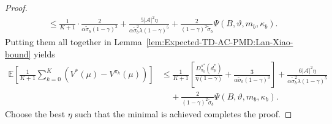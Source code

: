 \documentclass[10pt]{article}
\theoremstyle{plain}
\theoremstyle{definition}
\begin{document}
\begin{proof}
\begin{align*}
    &\leq \frac{1}{K+1}\cdot\frac{2}{\alpha\tilde{\sigma}_b(1-\gamma)^3}+\frac{5|\mathcal{A}|^2\eta}{\alpha\tilde{\sigma}_b^2\lambda(1-\gamma)^5}+\frac{2}{(1-\gamma)^2\tilde{\sigma}_b}\Psi({B},\vartheta,m_b,\kappa_b).
\end{align*}
Putting them all together {in Lemma~\ref{lem:Expected-TD-AC-PMD:Lan-Xiao-bound}} yields 
\begin{align*}
    \mathbb{E}\left[\frac{1}{K+1}\sum_{k=0}^K\left(V^*(\mu)-V^{\pi_k}(\mu)\right)\right] &\leq \frac{1}{K+1}\left[ \frac{D_{\pi_{0}}^{\pi^*}(d_\mu^*)}{{\eta}(1-\gamma)}+\frac{3}{\alpha\tilde{\sigma}_b(1-\gamma)^3}\right]+\frac{6|\mathcal{A}|^2{\eta}}{\alpha\tilde{\sigma}_b^2\lambda(1-\gamma)^5}\\
    &\;\;\;\;+\frac{2}{(1-\gamma)^2\tilde{\sigma}_b}\Psi({B},\vartheta,m_b,\kappa_b).
\end{align*}
Choose the best $\eta$ such that the minimal is achieved completes the proof.
\end{proof}
\end{document}
